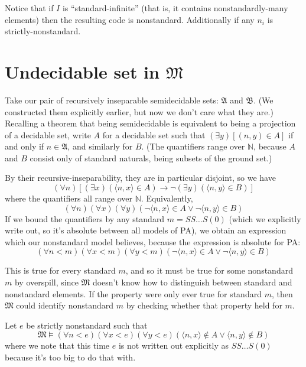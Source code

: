 \documentclass[11pt]{amsart}
\theoremstyle{remark}
\begin{document}
Notice that if $I$ is ``standard-infinite'' (that is, it contains nonstandardly-many elements) then the resulting code is nonstandard.
Additionally if any $n_i$ is strictly-nonstandard.

\section{Undecidable set in \texorpdfstring{$\mathfrak{M}$}{M}}
Take our pair of recursively inseparable semidecidable sets: $\mathfrak{A}$ and $\mathfrak{B}$.
(We constructed them explicitly earlier, but now we don't care what they are.)
Recalling a theorem that being semidecidable is equivalent to being a projection of a decidable set, 
write $A$ for a decidable set such that $(\exists y)[(n, y) \in A]$ if and only if $n \in \mathfrak{A}$,
and similarly for $B$.
(The quantifiers range over $\mathbb{N}$, because $A$ and $B$ consist only of standard naturals, being subsets of the ground set.)

By their recursive-inseparability, they are in particular disjoint, so we have $$(\forall n)[(\exists x)(\langle n, x \rangle \in A) \to \neg (\exists y)(\langle n, y \rangle \in B)]$$
where the quantifiers all range over $\mathbb{N}$.
Equivalently, $$(\forall n)(\forall x)(\forall y)(\neg \langle n,x \rangle \in A \vee \neg \langle n,y \rangle \in B)$$
If we bound the quantifiers by any standard $m = SS\dots S(0)$ (which we explicitly write out, so it's absolute between all models of PA), we obtain an expression which our nonstandard model believes, because the expression is absolute for PA:
$$(\forall n < m)(\forall x < m)(\forall y < m)(\neg \langle n,x \rangle \in A \vee \neg \langle n,y \rangle \in B)$$

This is true for every standard $m$, and so it must be true for some nonstandard $m$ by overspill, since $\mathfrak{M}$ doesn't know how to distinguish between standard and nonstandard elements.
If the property were only ever true for standard $m$, then $\mathfrak{M}$ could identify nonstandard $m$ by checking whether that property held for $m$.

Let $e$ be strictly nonstandard such that 
\begin{equation} \label{eqn:prop}
\mathfrak{M} \vDash (\forall n < e)(\forall x < e)(\forall y < e)(\langle n,x \rangle \not \in A \vee \langle n,y \rangle \not \in B)
\end{equation}
where we note that this time $e$ is not written out explicitly as $SS\dots S(0)$ because it's too big to do that with.
\end{document}
